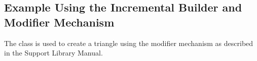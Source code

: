\subsection{Example Using the Incremental Builder and Modifier Mechanism}

The  class is used to create
a triangle using the modifier mechanism as described in the Support
Library Manual.




